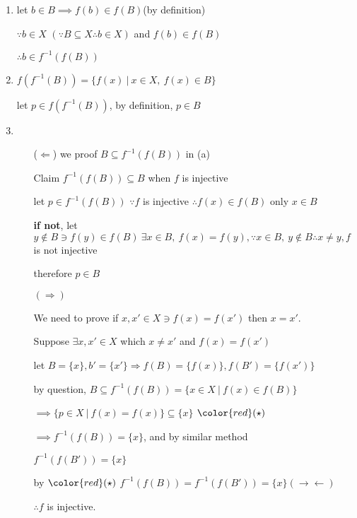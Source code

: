 \begin{tcolorbox}
	\begin{solution}$ $
		\begin{enumerate}[wide]
			\item let $b \in B \implies f(b) \in f(B)$(by definition)
			
			$\because b \in X$ $(\because B \subseteq X \therefore b \in X)$ and $f(b) \in f(B)$
			
			$\therefore b \in f^{-1}(f(B))$
			
			\item  $f(f^{-1}(B)) = \{f(x)~|~ x \in X,~f(x) \in B\}$
			
			let $p \in f(f^{-1}(B))$, by definition, $p \in B$
			
			\item 
			\begin{enumerate}
				\item[($\Leftarrow$)]
					we proof $B \subseteq f^{-1}(f(B))$ in (a)
					
					Claim $f^{-1}(f(B)) \subseteq B$ when $f$ is injective
					
					let $p \in f^{-1}(f(B))$ $\because f$ is injective $\therefore f(x) \in f(B)$ only $x \in B$
					
					\textbf{if not}, let $y \notin B \ni f(y) \in f(B) ~ \exists x \in B,~f(x) = f(y), \because x \in B,~y \notin B \therefore x \neq y, f$ is not injective
					
					therefore $p \in B$
				\item[$(\Rightarrow)$]
				
				We need to prove if $x,x' \in X \ni f(x) = f(x')$ then $x = x'$.
				
				Suppose $\exists x,x' \in X$ which $x \neq x'$ and $f(x) = f(x')$
				
				let $B = \{x\},b'=\{x'\} \Rightarrow f(B) = \{f(x)\},f(B') = \{f(x')\}$
				
				by question, $B \subseteq f^{-1}(f(B)) = \{x \in X ~|~ f(x) \in f(B)\}$
				
				$\implies \{p \in X ~|~ f(x) = f(x)\} \subseteq \{x\}$ $\color{red}(\star)$
				
				$\implies f^{-1}(f(B)) = \{x\}$, and by similar method  
				
				$f^{-1}(f(B')) = \{x\}$
				
				by $\color{red}(\star)$ $f^{-1}(f(B)) = f^{-1}(f(B')) = \{x\} (\rightarrow\leftarrow)$
				
				$\therefore f$ is injective.
			\end{enumerate} 
		\end{enumerate}
	\end{solution}
\end{tcolorbox}

